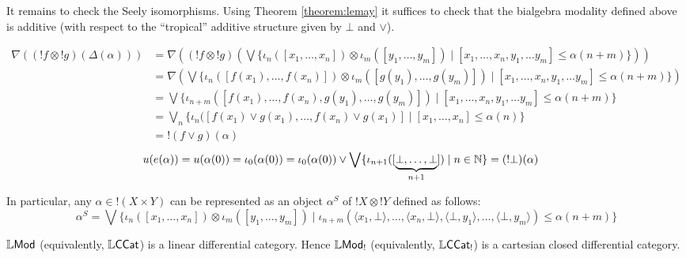 It remains to check the Seely isomorphisms.
Using Theorem \ref{theorem:lemay} it suffices to check that the bialgebra modality defined above is additive (with respect to the ``tropical'' additive structure given by $\bot$ and $\vee$).

{\small
\begin{align*}
\nabla((!f\otimes !g)(\Delta(\alpha))) & =
\nabla\left((!f\otimes !g)\left(
\bigvee\{\iota_{n}([x_{1},\dots, x_{n}])\otimes \iota_{m}([y_{1},\dots, y_{m}])\mid [x_{1},\dots, x_{n},y_{1},\dots y_{m}]\leq \alpha(n+m)\}
\right)\right)\\
&=
\nabla\left(
\bigvee\{\iota_{n}([f(x_{1}),\dots, f(x_{n})])\otimes \iota_{m}([g(y_{1}),\dots, g(y_{m})])\mid [x_{1},\dots, x_{n},y_{1},\dots y_{m}]\leq \alpha(n+m)\}
\right)\\
&=
\bigvee\{\iota_{n+m}([f(x_{1}),\dots, f(x_{n}),g(y_{1}),\dots, g(y_{m})])\mid [x_{1},\dots, x_{n},y_{1},\dots y_{m}]\leq \alpha(n+m)\}\\
&=
\bigvee_{n}\{ \iota_{n}([f(x_{1})\vee g(x_{1}),\dots, f(x_{n})\vee g(x_{1})]
\mid [x_{1},\dots, x_{n}]\leq \alpha(n)\}\\
&=
!(f\vee g)(\alpha)
\end{align*}
}
\begin{align*}
u(e(\alpha)) = u(\alpha(0))& =\iota_{0}(\alpha({0})) =
\iota_{0}(\alpha(0))\vee
\bigvee\{\iota_{n+1}([\underbrace{\bot,\dots, \bot}_{n+1}])\mid n\in \mathbb{N} \}=
(!\bot) (\alpha)
\end{align*}

In particular, any $\alpha\in !(X\times Y)$ can be represented 
as an object $\alpha^{S}$ of $!X\otimes !Y$ defined as follows:
$$
\alpha^{S}=\bigvee \{ \iota_{n}([x_{1},\dots, x_{n}])\otimes \iota_{m}([y_{1},\dots, y_{m}]) \mid
\iota_{n+m}(\langle x_{1},\bot\rangle,\dots, 
\langle x_{n},\bot\rangle,
\langle \bot, y_{1}\rangle, \dots,
\langle \bot, y_{m}\rangle) \leq \alpha(n+m)
\}
$$


\begin{theorem}
$\mathbb{L}\mathsf{Mod}$ (equivalently, $\mathbb{L}\mathsf{CCat}$) is a linear differential category. Hence $\mathbb{L}\mathsf{Mod}_{!}$ (equivalently, $\mathbb{L}\mathsf{CCat}_{!}$) is a cartesian closed differential category. 
\end{theorem}
%

